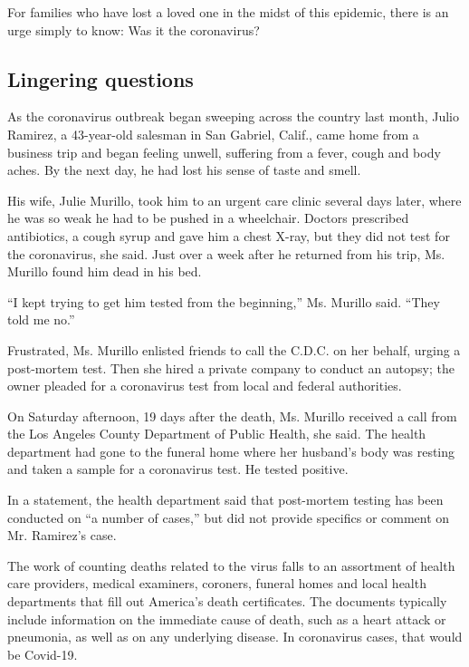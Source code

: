 For families who have lost a loved one in the midst of this epidemic,
there is an urge simply to know: Was it the coronavirus?

\hypertarget{lingering-questions}{%
\subsection{Lingering questions}\label{lingering-questions}}

As the coronavirus outbreak began sweeping across the country last
month, Julio Ramirez, a 43-year-old salesman in San Gabriel, Calif.,
came home from a business trip and began feeling unwell, suffering from
a fever, cough and body aches. By the next day, he had lost his sense of
taste and smell.

His wife, Julie Murillo, took him to an urgent care clinic several days
later, where he was so weak he had to be pushed in a wheelchair. Doctors
prescribed antibiotics, a cough syrup and gave him a chest X-ray, but
they did not test for the coronavirus, she said. Just over a week after
he returned from his trip, Ms. Murillo found him dead in his bed.

``I kept trying to get him tested from the beginning,'' Ms. Murillo
said. ``They told me no.''

Frustrated, Ms. Murillo enlisted friends to call the C.D.C. on her
behalf, urging a post-mortem test. Then she hired a private company to
conduct an autopsy; the owner pleaded for a coronavirus test from local
and federal authorities.

On Saturday afternoon, 19 days after the death, Ms. Murillo received a
call from the Los Angeles County Department of Public Health, she said.
The health department had gone to the funeral home where her husband's
body was resting and taken a sample for a coronavirus test. He tested
positive.

In a statement, the health department said that post-mortem testing has
been conducted on ``a number of cases,'' but did not provide specifics
or comment on Mr. Ramirez's case.

The work of counting deaths related to the virus falls to an assortment
of health care providers, medical examiners, coroners, funeral homes and
local health departments that fill out America's death certificates. The
documents typically include information on the immediate cause of death,
such as a heart attack or pneumonia, as well as on any underlying
disease. In coronavirus cases, that would be Covid-19.

